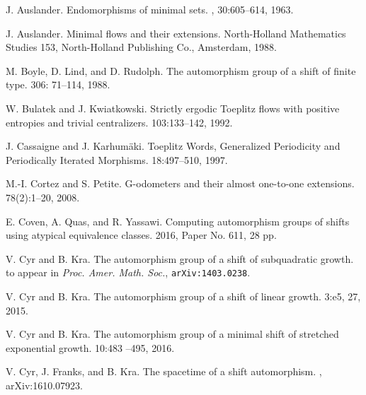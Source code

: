 \documentclass{daj}
\theoremstyle{plain}
\theoremstyle{definition}
\begin{document}

\begin{thebibliography}{99}
	
 J. Auslander.
\newblock Endomorphisms of minimal sets.
, 30:605--614, 1963.

 J. Auslander.
\newblock  Minimal flows and their extensions.
\newblock  North-Holland Mathematics Studies 153, North-Holland Publishing Co., Amsterdam, 1988.

M. Boyle, D. Lind, and D. Rudolph.
\newblock The automorphism group of a shift of finite type.
 306: 71--114, 1988.

 W. Bulatek and J. Kwiatkowski.
\newblock Strictly ergodic Toeplitz flows with positive entropies and trivial centralizers.
 103:133--142, 1992. 

 J. Cassaigne and J. Karhum\"aki.
\newblock Toeplitz Words, Generalized Periodicity and Periodically Iterated Morphisms.
 18:497--510, 1997.

 M.-I. Cortez and S. Petite.
\newblock G-odometers and their almost one-to-one extensions.
 78(2):1--20,  2008. 

 E. Coven, A. Quas, and R. Yassawi.
\newblock Computing automorphism groups of shifts using atypical equivalence classes.
 2016, Paper No. 611, 28 pp.

 V. Cyr and B. Kra.
\newblock The automorphism group of a shift of subquadratic growth.
\newblock to appear in {\it Proc. Amer. Math. Soc.}, {\tt arXiv:1403.0238}.

 V. Cyr and B. Kra.
\newblock The automorphism group of a shift of linear growth.
 3:e5, 27, 2015.

 V. Cyr and B. Kra.
\newblock The automorphism group of a minimal shift of stretched exponential growth.
  10:483 --495, 2016. 

 V. Cyr, J. Franks, and B. Kra.
\newblock The spacetime of a shift automorphism.
, { arXiv:1610.07923}. 


\end{thebibliography}
\end{document}
